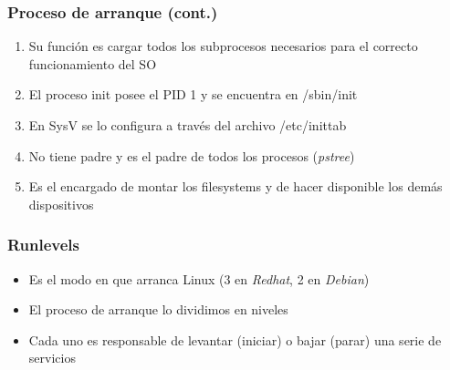 \begin{frame}
  \frametitle{Proceso de arranque (cont.)}
  \begin{enumerate}
	\item Su función es cargar todos los subprocesos necesarios para el correcto funcionamiento del SO
	\item El proceso init posee el PID 1 y se encuentra en /sbin/init
	\item En SysV se lo configura a través del archivo /etc/inittab
	\item No tiene padre y es el padre de todos los procesos (\textit{pstree})
	\item Es el encargado de montar los filesystems y de hacer disponible los demás dispositivos
  \end{enumerate}
\end{frame}

\begin{frame}
  \frametitle{Runlevels}
  \begin{itemize}
	  	\item Es el modo en que arranca Linux (3 en \emph{Redhat}, 2 en \emph{Debian})

	  	\item El proceso de arranque lo dividimos en niveles

	  	\item Cada uno es responsable de levantar (iniciar) o bajar (parar) una serie de servicios
  \end{itemize}
\end{frame}

